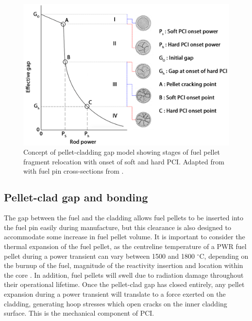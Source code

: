 \begin{figure}[ht] %
\centering
\includegraphics[width=15cm]{images/relocation.png}
\caption[Concept of pellet-cladding gap model showing stages of fuel pellet fragment relocation with onset of soft and hard PCI. ]{Concept of pellet-cladding gap model showing stages of fuel pellet fragment relocation with onset of soft and hard PCI. Adapted from \cite{Oguma1983} with fuel pin cross-sections from \cite{walton1983fuel}.}
\label{figure:relocation}
\end{figure}

\subsection{Pellet-clad gap and bonding}

The gap between the fuel and the cladding allows fuel pellets to be inserted into the fuel pin easily during manufacture, but this clearance is also designed to accommodate some increase in fuel pellet volume. It is important to consider the thermal expansion of the fuel pellet, as the centreline temperature of a PWR fuel pellet during a power transient can vary between 1500 and 1800 $^{\circ}$C, depending on the burnup of the fuel, magnitude of the reactivity insertion and location within the core \cite{Bagger1994}. In addition, fuel pellets will swell due to radiation damage throughout their operational lifetime. Once the pellet-clad gap has closed entirely, any pellet expansion during a power transient will translate to a force exerted on the cladding, generating hoop stresses which open cracks on the inner cladding surface. This is the mechanical component of PCI.

